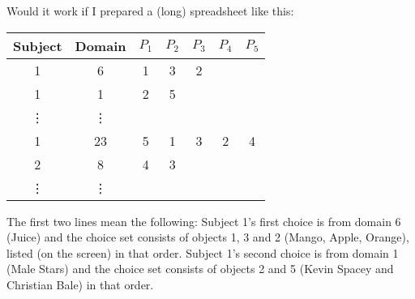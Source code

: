 \documentclass[11pt,letter]{amsart}
\begin{document}
\setpagewiselinenumbers
\modulolinenumbers[5]
\linenumbers
\doublespace
{}

Would it work if I prepared a (long) spreadsheet like this:

\vspace{0.5cm}
\begin{tabular}{cc|ccccc}
	Subject & Domain & $P_1$ & $P_2$ & $P_3$ & $P_4$ & $P_5$ \\
	\hline
	1 & 6 & 1 & 3 & 2 \\
	1 & 1 & 2 & 5 \\
	\vdots & \vdots \\
	1 & 23 & 5 & 1 & 3 & 2 & 4 \\
	\hline
	2 & 8 & 4 & 3 \\
	\vdots & \vdots \\
\end{tabular}
\vspace{0.5cm}

The first two lines mean the following:
Subject 1's first choice is from domain 6 (Juice) and the choice set consists of objects 1, 3 and 2 (Mango, Apple, Orange), listed (on the screen) in that order.
Subject 1's second choice is from domain 1 (Male Stars) and the choice set consists of objects 2 and 5 (Kevin Spacey and Christian Bale) in that order.



\end{document}
